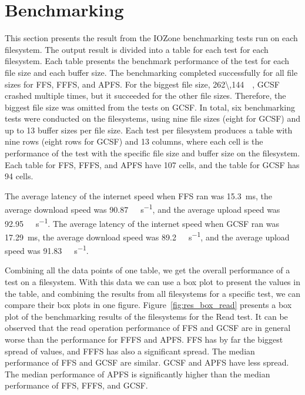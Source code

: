 \section{Benchmarking}
\label{sec:res_bench}
This section presents the result from the IOZone benchmarking tests run on each filesystem. The output result is divided into a table for each test for each filesystem. Each table presents the benchmark performance of the test for each file size and each buffer size. The benchmarking completed successfully for all file sizes for \gls{FFS}, \gls{FFFS}, and \gls{APFS}. For the biggest file size, \SI{262\,144}{\kilo\byte}, \gls{GCSF} crashed multiple times, but it succeeded for the other file sizes. Therefore, the biggest file size was omitted from the tests on \gls{GCSF}. In total, six benchmarking tests were conducted on the filesystems, using nine file sizes (eight for \gls{GCSF}) and up to 13 buffer sizes per file size. Each test per filesystem produces a table with nine rows (eight rows for \gls{GCSF}) and 13 columns, where each cell is the performance of the test with the specific file size and buffer size on the filesystem. Each table for \gls{FFS}, \gls{FFFS}, and \gls{APFS} have 107 cells, and the table for \gls{GCSF} has 94 cells.

The average latency of the internet speed when \gls{FFS} ran was \SI{15.3}{\milli\second}, the average download speed was \SI[per-mode = symbol]{90.87}{\mega\bit\per\second}, and the average upload speed was \SI[per-mode = symbol]{92.95}{\mega\bit\per\second}. The average latency of the internet speed when \gls{GCSF} ran was \SI{17.29}{\milli\second}, the average download speed was \SI[per-mode = symbol]{89.2}{\mega\bit\per\second}, and the average upload speed was \SI[per-mode = symbol]{91.83}{\mega\bit\per\second}.

Combining all the data points of one table, we get the overall performance of a test on a filesystem. With this data we can use a box plot to present the values in the table, and combining the results from all filesystems for a specific test, we can compare their box plots in one figure. Figure~\ref{fig:res_box_read} presents a box plot of the benchmarking results of the filesystems for the Read test. It can be observed that the read operation performance of \gls{FFS} and \gls{GCSF} are in general worse than the performance for \gls{FFFS} and \gls{APFS}. \gls{FFS} has by far the biggest spread of values, and \gls{FFFS} has also a significant spread. The median performance of \gls{FFS} and \gls{GCSF} are similar. \gls{GCSF} and \gls{APFS} have less spread. The median performance of \gls{APFS} is significantly higher than the median performance of \gls{FFS}, \gls{FFFS}, and \gls{GCSF}. 

